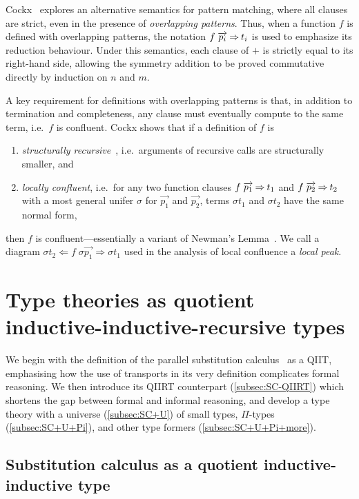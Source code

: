 \documentclass[a4paper,UKenglish,numberwithinsect,cleveref,thm-restate]{lipics-v2021}
\begin{document}
Cockx~\cite{Cockx2014} explores an alternative semantics for pattern matching, where all clauses are strict, even in the presence of \emph{overlapping patterns}.
Thus, when a function $f$ is defined with overlapping patterns, the notation $f\;\overrightarrow{p_i} \mathbin{\Rightarrow} t_i$ is used to emphasize its reduction behaviour.
Under this semantics, each clause of $+$ is strictly equal to its right-hand side, allowing the symmetry addition to be proved commutative directly by induction on $n$ and $m$.

A key requirement for definitions with overlapping patterns is that, in addition to termination and completeness, any clause must eventually compute to the same term, i.e.\ $f$ is confluent.
Cockx shows that if a definition of $f$ is
\begin{enumerate}
  \item \emph{structurally recursive}~\cite{Abel2002}, i.e.\ arguments of recursive calls are structurally smaller, and
  \item \emph{locally confluent}, i.e.\ for any two function clauses $f\;\overrightarrow{p_1} \mathbin{\Rightarrow} t_1$ and $f\;\overrightarrow{p_2} \mathbin{\Rightarrow} t_2$ with a most general unifer $\sigma$ for $\overrightarrow{p_1}$ and $\overrightarrow{p_2}$, terms $\sigma t_1$ and $\sigma t_2$ have the same normal form, 
\end{enumerate}
then $f$ is confluent---essentially a variant of Newman's Lemma~\cite{Newman1942}.
We call a diagram $\sigma t_2 \Leftarrow f\;\sigma\overrightarrow{p_1} \Rightarrow \sigma t_1$ used in the analysis of local confluence a \emph{local peak}.


\section{Type theories as quotient inductive-inductive-recursive types} \label{sec:QIIRTs}

We begin with the definition of the parallel substitution calculus~\cite{Martin-Lof1992} as a QIIT, emphasising how the use of transports in its very definition complicates formal reasoning.
We then introduce its QIIRT counterpart (\cref{subsec:SC-QIIRT}) which shortens the gap between formal and informal reasoning, and develop a type theory with a universe (\cref{subsec:SC+U}) of small types, $\Pi$-types (\cref{subsec:SC+U+Pi}), and other type formers (\cref{subsec:SC+U+Pi+more}).

\subsection{Substitution calculus as a quotient inductive-inductive type} \label{subsec:SC-QIIT}
\end{document}
